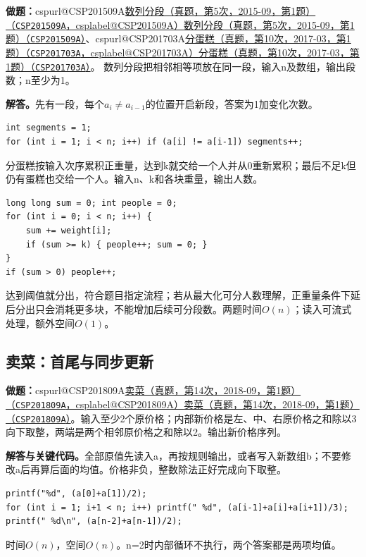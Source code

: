 \documentclass[UTF8,11pt,a4paper,fontset=none]{ctexart}
\makeatletter
\newcommand{\csp}[2]{\ifcsname cspurl@#1\endcsname\href{\csname cspurl@#1\endcsname}{#2（\texttt{#1}，\csname csplabel@#1\endcsname）}\else\href{https://oj.shumeng.tech/p/#1}{#2（\texttt{#1}）}\fi}
\makeatother
\begin{document}
\noindent\textbf{做题：}\csp{CSP201509A}{数列分段（真题，第5次，2015-09，第1题）}、\csp{CSP201703A}{分蛋糕（真题，第10次，2017-03，第1题）}。
数列分段把相邻相等项放在同一段，输入n及数组，输出段数；n至少为1。

\noindent\textbf{解答。}先有一段，每个$a_i\ne a_{i-1}$的位置开启新段，答案为1加变化次数。
\par\noindent\begin{minipage}{\linewidth}
\begin{lstlisting}
int segments = 1;
for (int i = 1; i < n; i++) if (a[i] != a[i-1]) segments++;
\end{lstlisting}
\end{minipage}\par
分蛋糕按输入次序累积正重量，达到k就交给一个人并从0重新累积；最后不足k但仍有蛋糕也交给一个人。输入n、k和各块重量，输出人数。
\par\noindent\begin{minipage}{\linewidth}
\begin{lstlisting}
long long sum = 0; int people = 0;
for (int i = 0; i < n; i++) {
    sum += weight[i];
    if (sum >= k) { people++; sum = 0; }
}
if (sum > 0) people++;
\end{lstlisting}
\end{minipage}\par
达到阈值就分出，符合题目指定流程；若从最大化可分人数理解，正重量条件下延后分出只会消耗更多块，不能增加后续可分段数。两题时间$O(n)$；读入可流式处理，额外空间$O(1)$。
\subsection{卖菜：首尾与同步更新}

\noindent\textbf{做题：}\csp{CSP201809A}{卖菜（真题，第14次，2018-09，第1题）}。输入至少2个原价格；内部新价格是左、中、右原价格之和除以3向下取整，两端是两个相邻原价格之和除以2。输出新价格序列。

\noindent\textbf{解答与关键代码。}全部原值先读入a，再按规则输出，或者写入新数组b；不要修改a后再算后面的均值。价格非负，整数除法正好完成向下取整。
\par\noindent\begin{minipage}{\linewidth}
\begin{lstlisting}
printf("%d", (a[0]+a[1])/2);
for (int i = 1; i+1 < n; i++) printf(" %d", (a[i-1]+a[i]+a[i+1])/3);
printf(" %d\n", (a[n-2]+a[n-1])/2);
\end{lstlisting}
\end{minipage}\par
时间$O(n)$，空间$O(n)$。n=2时内部循环不执行，两个答案都是两项均值。
\end{document}
